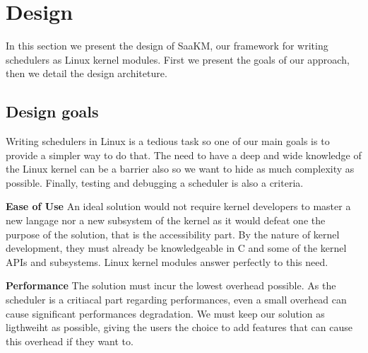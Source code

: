 \section{Design}
\label{sec:scheduler-as-a-kernel-module}



\par In this section we present the design of SaaKM, our framework for writing schedulers as Linux kernel modules. First we present the goals of our approach, then we detail the design architeture.

\subsection{Design goals} Writing schedulers in Linux is a tedious task so one of our main goals is to provide a simpler way to do that. The need to have a deep and wide knowledge of the Linux kernel can be a barrier also so we want to hide as much complexity as possible. Finally, testing and debugging a scheduler is also a criteria.

\textbf{Ease of Use} An ideal solution would not require kernel developers to master a new langage nor a new subsystem of the kernel as it would defeat one the purpose of the solution, that is the accessibility part. By the nature of kernel development, they must already be knowledgeable in C and some of the kernel APIs and subsystems. Linux kernel modules answer perfectly to this need.

\textbf{Performance} The solution must incur the lowest overhead possible. As the scheduler is a critiacal part regarding performances, even a small overhead can cause significant performances degradation. We must keep our solution as ligthweiht as possible, giving the users the choice to add features that can cause this overhead if they want to.

